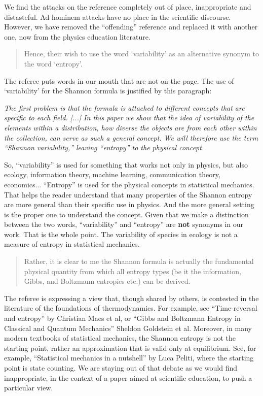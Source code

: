 \documentclass[11pt]{article}
\begin{document}
We find the attacks on the reference completely out of place, inappropriate and distasteful. Ad hominem attacks have no place in the scientific discourse. However, we have removed the ``offending'' reference and replaced it with another one, now from the physics education literature.

\begin{quote}
Hence, their wish to use the word ‘variability’ as an alternative synonym to the word ‘entropy’.
\end{quote}

The referee puts words in our mouth that are not on the page. The use of `variability' for the Shannon formula is justified by this paragraph:

\emph{The first problem is that the formula is attached to different concepts that are specific to each field. [...] In this paper we show that the idea of variability of the elements within a distribution, how diverse the objects are from each other within the collection, can serve as such a general concept. We will therefore use the term \emph{``Shannon variability,''} leaving ``entropy'' to the physical concept.}

So, ``variability'' is used for something that works not only in physics, but also ecology, information theory, machine learning, communication theory, economics... ``Entropy'' is used for the physical concepts in statistical mechanics. That helps the reader understand that many properties of the Shannon entropy are more general than their specific use in physics. And the more general setting is the proper one to understand the concept. Given that we make a distinction between the two words, ``variability'' and ``entropy'' are \textbf{not} synonyms in our work. That is the whole point. The variability of species in ecology is not a measure of entropy in statistical mechanics.

\begin{quote}
Rather, it is clear to me the Shannon formula is actually the fundamental physical quantity from which all entropy types (be it the information, Gibbs, and Boltzmann entropies etc.) can be derived.
\end{quote}
The referee is expressing a view that, though shared by others, is contested in the literature of the foundations of thermodynamics. For example, see ``Time-reversal and entropy'' by Christian Maes et al, or ``Gibbs and Boltzmann Entropy in Classical and Quantum Mechanics''
Sheldon Goldstein et al. Moreover, in many modern textbooks of statistical mechanics, the Shannon entropy is not the starting point, rather an approximation that is valid only at equilibrium. See, for example, ``Statistical mechanics in a nutshell'' by Luca Peliti, where the starting point is state counting. We are staying out of that debate as we would find inappropriate, in the context of a paper aimed at scientific education, to push a particular view.
\end{document}
